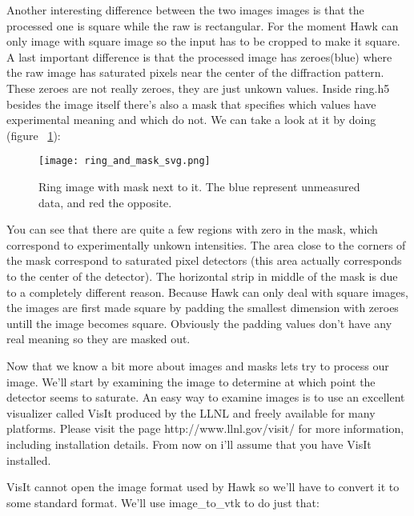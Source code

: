 \documentclass{report}
\begin{document}
Another interesting difference between the two images images is that the processed one is square while the raw is rectangular.
For the moment Hawk can only image with square image so the input has to be cropped to make it square.
A last important difference is that the processed image has zeroes(blue) where the raw image has saturated pixels near the center
of the diffraction pattern. These zeroes are not really zeroes, they are just unkown values. Inside ring.h5 besides the image itself
there's also a mask that specifies which values have experimental meaning and which do not. We can take a look at it by doing (figure ~\ref{ring-mask}):



\begin{figure}[htp]
\centering
\texttt{[image: ring\_and\_mask\_svg.png]}
\caption{Ring image with mask next to it. The blue represent unmeasured data, and red the opposite.}
\label{ring-mask}
\end{figure}

You can see that there are quite a few regions with zero in the mask, which correspond to experimentally unkown intensities.
The area close to the corners of the mask correspond to saturated pixel detectors (this area actually corresponds to the
center of the detector). The horizontal strip in middle of the mask is due to a completely different reason. Because
Hawk can only deal with square images, the images are first made square by padding the smallest dimension with zeroes untill
the image becomes square. Obviously the padding values don't have any real meaning so they are masked out.


Now that we know a bit more about images and masks lets try to process our image.
We'll start by examining the image to determine at which point the detector seems to saturate.
An easy way to examine images is to use an excellent visualizer called VisIt produced by the LLNL
and freely available for many platforms. Please visit the page http://www.llnl.gov/visit/ for
more information, including installation details. From now on i'll assume that you have VisIt installed.


VisIt cannot open the image format used by Hawk so we'll have to convert it to some standard format. We'll use 
image\_to\_vtk to do just that:

\end{document}
